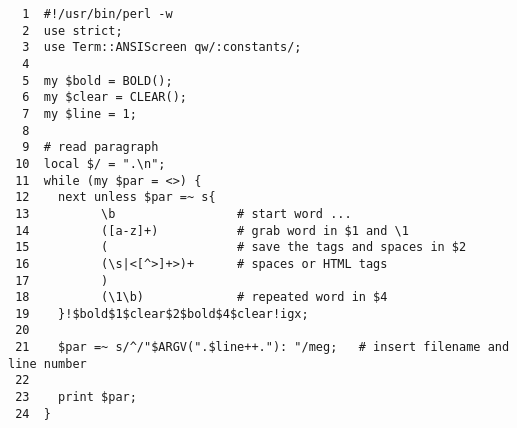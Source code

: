 \begin{latexonly}
\begin{verbatim}
  1  #!/usr/bin/perl -w
  2  use strict;
  3  use Term::ANSIScreen qw/:constants/;
  4  
  5  my $bold = BOLD();
  6  my $clear = CLEAR();
  7  my $line = 1;
  8  
  9  # read paragraph
 10  local $/ = ".\n";
 11  while (my $par = <>) {
 12    next unless $par =~ s{
 13          \b                 # start word ...
 14          ([a-z]+)           # grab word in $1 and \1
 15          (                  # save the tags and spaces in $2
 16          (\s|<[^>]+>)+      # spaces or HTML tags 
 17          )   
 18          (\1\b)             # repeated word in $4
 19    }!$bold$1$clear$2$bold$4$clear!igx;
 20  
 21    $par =~ s/^/"$ARGV(".$line++."): "/meg;   # insert filename and line number
 22  
 23    print $par;
 24  }
\end{verbatim}
\end{latexonly}
